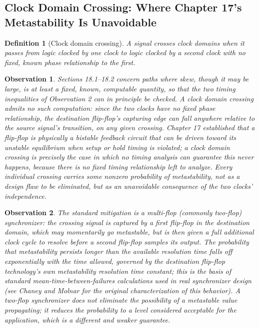 \documentclass[12pt]{article}
\newtheorem{definition}{Definition}
\newtheorem{observation}{Observation}
\begin{document}
\subsection{Clock Domain Crossing: Where Chapter 17's Metastability Is Unavoidable}

\begin{definition}[Clock domain crossing]
A signal crosses clock domains when it passes from logic clocked by one clock to logic clocked by a second clock with no fixed, known phase relationship to the first.
\end{definition}

\begin{observation}
Sections 18.1--18.2 concern paths where skew, though it may be large, is at least a fixed, known, computable quantity, so that the two timing inequalities of Observation 2 can in principle be checked. A clock domain crossing admits no such computation: since the two clocks have no fixed phase relationship, the destination flip-flop's capturing edge can fall anywhere relative to the source signal's transition, on any given crossing. Chapter 17 established that a flip-flop is physically a bistable feedback circuit that can be driven toward its unstable equilibrium when setup or hold timing is violated; a clock domain crossing is precisely the case in which no timing analysis can guarantee this never happens, because there is no fixed timing relationship left to analyze. Every individual crossing carries some nonzero probability of metastability, not as a design flaw to be eliminated, but as an unavoidable consequence of the two clocks' independence.
\end{observation}

\begin{observation}
The standard mitigation is a multi-flop (commonly two-flop) synchronizer: the crossing signal is captured by a first flip-flop in the destination domain, which may momentarily go metastable, but is then given a full additional clock cycle to resolve before a second flip-flop samples its output. The probability that metastability persists longer than the available resolution time falls off exponentially with the time allowed, governed by the destination flip-flop technology's own metastability resolution time constant; this is the basis of standard mean-time-between-failures calculations used in real synchronizer design (see Chaney and Molnar for the original characterization of this behavior). A two-flop synchronizer does not eliminate the possibility of a metastable value propagating; it reduces the probability to a level considered acceptable for the application, which is a different and weaker guarantee.
\end{observation}
\end{document}
